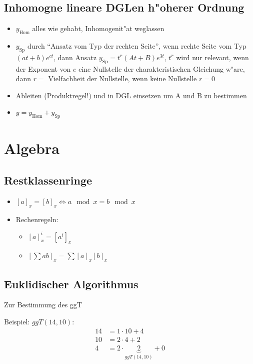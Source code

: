 \documentclass[fleqn,12pt]{scrartcl}
\begin{document}
		\subsection{Inhomogne lineare DGLen h"oherer Ordnung}
		\begin{itemize}
			\item
				$y_\text{Hom}$ alles wie gehabt, Inhomogenit"at weglassen
			\item
				$y_\text{Sp}$ durch \enquote{Ansatz vom Typ der rechten Seite}, wenn rechte Seite vom Typ $(at + b)e^{ct}$, dann Ansatz $y_\text{Sp} = t^r(At+B)e^{3t}$, $t^r$ wird nur relevant, wenn der Exponent von $e$ eine Nullstelle der charakteristischen Gleichung w"are, dann $r = \text{ Vielfachheit der Nullstelle}$, wenn keine Nullstelle $r = 0$%
			\item
				Ableiten (Produktregel!) und in DGL einsetzen um A und B zu bestimmen
			\item
				$y = y_\text{Hom} + y_\text{Sp}$
		\end{itemize}


		\section{Algebra}
		\subsection{Restklassenringe}
		\begin{itemize}
			\item
				$[a]_x = [b]_x \Leftrightarrow a\mod x = b \mod x$
			\item
				Rechenregeln:
				\begin{itemize}
					\item
						$[a]_x^i = [a^i]_x$
					\item
						$\left[\sum ab\right]_x = \sum [a]_x [b]_x$
				\end{itemize}
		\end{itemize}


		\subsection{Euklidischer Algorithmus}
		Zur Bestimmung des ggT 

		Beispiel: $ggT(14, 10)$:
		\begin{align*}
			14 &= 1 \cdot 10 + 4 \\
			10 &= 2 \cdot 4 + 2 \\
			4 &= 2 \cdot \underbrace{2}_{ggT(14,10)} + 0
		\end{align*}
\end{document}
